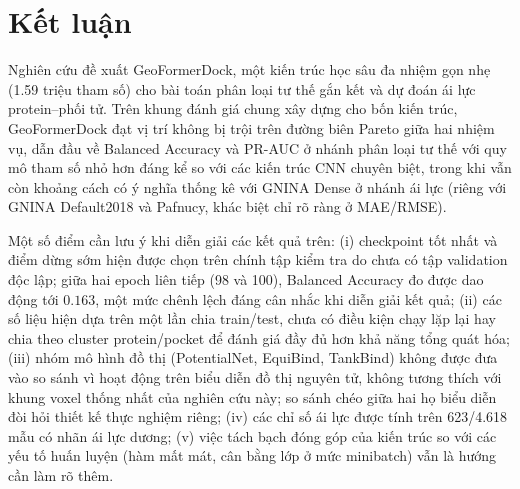 \section{Kết luận}
Nghiên cứu đề xuất GeoFormerDock, một kiến trúc học sâu đa nhiệm gọn nhẹ (1.59 triệu tham số) cho bài toán phân loại tư thế gắn kết và dự đoán ái lực protein--phối tử. Trên khung đánh giá chung xây dựng cho bốn kiến trúc, GeoFormerDock đạt vị trí không bị trội trên đường biên Pareto giữa hai nhiệm vụ, dẫn đầu về Balanced Accuracy và PR-AUC ở nhánh phân loại tư thế với quy mô tham số nhỏ hơn đáng kể so với các kiến trúc CNN chuyên biệt, trong khi vẫn còn khoảng cách có ý nghĩa thống kê với GNINA Dense ở nhánh ái lực (riêng với GNINA Default2018 và Pafnucy, khác biệt chỉ rõ ràng ở MAE/RMSE).

Một số điểm cần lưu ý khi diễn giải các kết quả trên: (i) checkpoint tốt nhất và điểm dừng sớm hiện được chọn trên chính tập kiểm tra do chưa có tập validation độc lập; giữa hai epoch liên tiếp (98 và 100), Balanced Accuracy đo được dao động tới $0.163$, một mức chênh lệch đáng cân nhắc khi diễn giải kết quả; (ii) các số liệu hiện dựa trên một lần chia train/test, chưa có điều kiện chạy lặp lại hay chia theo cluster protein/pocket để đánh giá đầy đủ hơn khả năng tổng quát hóa; (iii) nhóm mô hình đồ thị (PotentialNet, EquiBind, TankBind) không được đưa vào so sánh vì hoạt động trên biểu diễn đồ thị nguyên tử, không tương thích với khung voxel thống nhất của nghiên cứu này; so sánh chéo giữa hai họ biểu diễn đòi hỏi thiết kế thực nghiệm riêng; (iv) các chỉ số ái lực được tính trên 623/4.618 mẫu có nhãn ái lực dương; (v) việc tách bạch đóng góp của kiến trúc so với các yếu tố huấn luyện (hàm mất mát, cân bằng lớp ở mức minibatch) vẫn là hướng cần làm rõ thêm.
